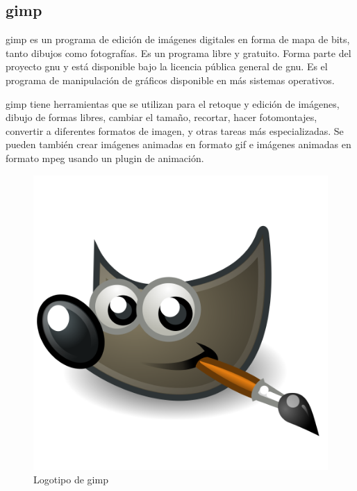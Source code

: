 	\subsection{\acrshort{gimp}}

		\acrfull{gimp} es un programa de edición de imágenes digitales en forma de mapa de bits, tanto dibujos como fotografías. Es un programa libre y gratuito. Forma parte del proyecto \acrshort{gnu} y está disponible bajo la licencia pública general de \acrshort{gnu}. Es el programa de manipulación de gráficos disponible en más sistemas operativos.

		\acrshort{gimp} tiene herramientas que se utilizan para el retoque y edición de imágenes, dibujo de formas libres, cambiar el tamaño, recortar, hacer fotomontajes, convertir a diferentes formatos de imagen, y otras tareas más especializadas. Se pueden también crear imágenes animadas en formato \acrshort{gif} e imágenes animadas en formato \acrshort{mpeg} usando un plugin de animación.

		\begin{figure}[!htp]
			 \centering
			 \includegraphics[scale=.15]{fig/gimp}
			 \caption{Logotipo de \acrshort{gimp}}
			 \label{fig:gimp}
		\end{figure}

		\FloatBarrier

